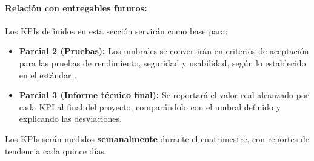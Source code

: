 \documentclass[12pt]{article}
\begin{document}
\paragraph{Relación con entregables futuros:} Los KPIs definidos en esta sección servirán como base para:
\begin{itemize}
    \item \textbf{Parcial 2 (Pruebas):} Los umbrales se convertirán en criterios de aceptación para las pruebas de rendimiento, seguridad y usabilidad, según lo establecido en el estándar \cite{istqb2023}.
    \item \textbf{Parcial 3 (Informe técnico final):} Se reportará el valor real alcanzado por cada KPI al final del proyecto, comparándolo con el umbral definido y explicando las desviaciones.
\end{itemize}

\vspace{0.3cm}
\noindent Los KPIs serán medidos \textbf{semanalmente} durante el cuatrimestre, con reportes de tendencia cada quince días.

\newpage



\printbibliography[title={Referencias}]
\end{document}
